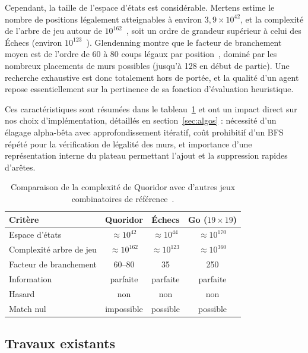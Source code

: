 \documentclass[a4paper]{article}
\begin{document}
Cependant, la taille de l'espace d'états est considérable. Mertens
estime le nombre de positions légalement atteignables à environ
$3{,}9 \times 10^{42}$, et la complexité de l'arbre de jeu autour de
$10^{162}$~\cite{mertens2006}, soit un ordre de grandeur supérieur à
celui des Échecs (environ $10^{123}$~\cite{russell2020aima}).
Glendenning montre que le facteur de branchement moyen est de l'ordre
de 60 à 80 coups légaux par position~\cite{glendenning2005}, dominé
par les nombreux placements de murs possibles (jusqu'à 128 en début
de partie). Une recherche exhaustive est donc totalement hors de
portée, et la qualité d'un agent repose essentiellement sur la
pertinence de sa fonction d'évaluation heuristique.

Ces caractéristiques sont résumées dans le tableau~\ref{tab:complexite} et ont un impact direct sur nos choix
d'implémentation, détaillés en section~\ref{sec:algos} : nécessité
d'un élagage alpha-bêta avec approfondissement itératif, coût
prohibitif d'un BFS répété pour la vérification de légalité des murs,
et importance d'une représentation interne du plateau permettant
l'ajout et la suppression rapides d'arêtes.

\begin{table}[H]
  \centering
  \begin{tabular}{lccc}
    \hline
    \textbf{Critère} & \textbf{Quoridor} & \textbf{Échecs} & \textbf{Go ($19\times19$)} \\
    \hline
    Espace d'états & $\approx 10^{42}$ & $\approx 10^{44}$ & $\approx 10^{170}$ \\
    Complexité arbre de jeu & $\approx 10^{162}$ & $\approx 10^{123}$ & $\approx 10^{360}$ \\
    Facteur de branchement & 60--80 & 35 & 250 \\
    Information & parfaite & parfaite & parfaite \\
    Hasard & non & non & non \\
    Match nul & impossible & possible & possible \\
    \hline
  \end{tabular}
  \caption{Comparaison de la complexité de Quoridor avec d'autres jeux combinatoires de référence~\cite{mertens2006,glendenning2005,russell2020aima}.}
  \label{tab:complexite}
\end{table}

\subsection{Travaux existants}
\label{subsec:existant}
\end{document}
